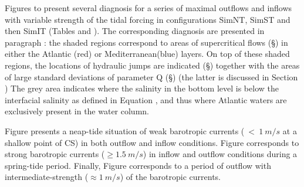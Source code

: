 Figures  to  present several diagnosis for a series of maximal outflows and inflows with variable strength of the tidal forcing in configurations SimNT, SimST and then SimIT (Tables  and ). The corresponding diagnosis are presented in paragraph : the shaded regions correspond to areas of supercritical flows (\S {}) in either the Atlantic (red) or Mediterranean(blue) layers. On top of these shaded regions, the locations of hydraulic jumps are indicated (\S {}) together with the areas of large standard deviations of parameter Q (\S {}) (the latter is discussed in Section ) The grey area indicates where the salinity in the bottom level is below the interfacial salinity as defined in Equation , and thus where Atlantic waters are exclusively present in the water column. 

Figure  presents a neap-tide situation of weak barotropic currents ($\ <\ 1\ m/s$ at a shallow point of CS) in both outflow and inflow conditions. Figure  corresponds to strong barotropic currents ($\geq 1.5\ m/s$) in inflow and outflow conditions during a spring-tide period. Finally, Figure  corresponds to a period of outflow with intermediate-strength ($\approx 1\ m/s$) of the barotropic currents.

